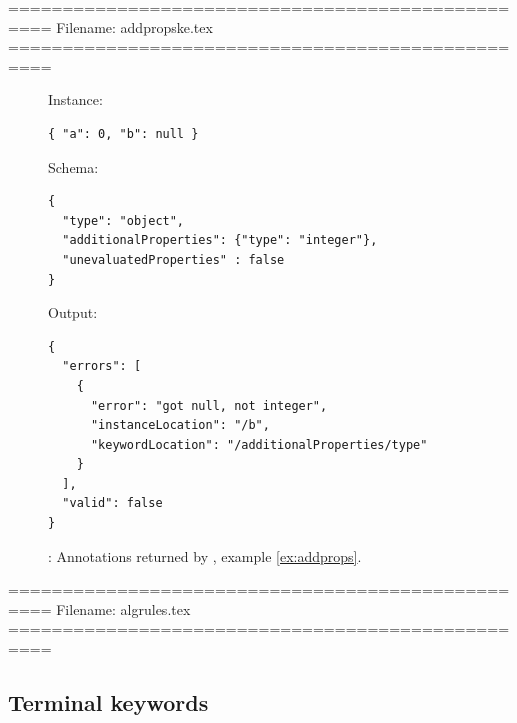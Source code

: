 ==================================================
Filename: addpropske.tex
==================================================
\begin{figure}
\small

Instance:
\begin{querybox}{}
\begin{lstlisting}[style=querynonumbers]
{ "a": 0, "b": null }
\end{lstlisting}
\end{querybox}

Schema:
\begin{querybox}{}
\begin{lstlisting}[style=query]
{
  "type": "object",
  "additionalProperties": {"type": "integer"},
  "unevaluatedProperties" : false
}
\end{lstlisting}
\end{querybox}

Output:
\begin{querybox}{}
\begin{lstlisting}[style=query]
{
  "errors": [
    {
      "error": "got null, not integer",
      "instanceLocation": "/b",
      "keywordLocation": "/additionalProperties/type"
    }
  ],
  "valid": false
}
\end{lstlisting}
\end{querybox}
\caption{{\qunProps}: Annotations returned by {\KE}, example \ref{ex:addprops}.}
\label{fig:addpropsjs}
\end{figure}


==================================================
Filename: algrules.tex
==================================================




\hide{
\adcomm
\adescr
\adefault
\adefs  -----------
\addefs
\atitle
\aname
\atags
\acomment
\aid
\adid
\adschema
\ada
\addref
\adda
}



\subsection{Terminal keywords}\label{sec:typecond}


%
%
%
%

